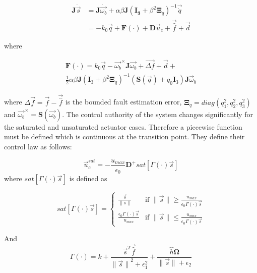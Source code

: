 \begin{equation}
    \begin{split}
        \mathbf{J}\dot{\vec{s}}&=
        \mathbf{J}\dot{\vec{\omega_b}} + \alpha\beta\mathbf{J}(\mathbf{I_3}+\beta^2\mathbf{\Xi}_q)^{-1}\vec{\dot{q}}\\
        &=-k_0\vec{q}+\mathbf{F}(\cdot)+\mathbf{D}\vec{u}_{c}+\vec{\hat{f}}+\vec{d}
    \end{split}
\end{equation}

where

\begin{multline}
    \mathbf{F}(\cdot)=k_0\vec{q}-\vec{\omega_b}^{\times}\mathbf{J}\vec{\omega_b}+\vec{\Delta f} + \vec{d} + \\
    \frac{1}{2}\alpha\beta\mathbf{J}(\mathbf{I}_3+\beta^2\mathbf{\Xi}_q)^{-1}(\mathbf{S}(\vec{q})+q_0\mathbf{I}_3)\mathbf{J}\vec{\omega}_{b}
\end{multline}

where $\Delta \vec{f}=\vec{f}-\vec{\hat{f}}$ is the bounded fault estimation error,
$\mathbf{\Xi}_q=diag(q_1^2,q_2^2,q_3^2)$ and
$\vec{\omega_b}^{\times}=\mathbf{S}(\vec{\omega_b})$. 
The control authority of the system changes significantly for the saturated and unsaturated actuator cases. Therefore a piecewise function must be defined which is continuous at the transition point. They define their control law as follows:

\begin{equation}
\vec{u}^{sat}_{c} = -\frac{u_{max}}{\epsilon_{0}}\mathbf{D}^+ sat[\Gamma(\cdot)\vec{s}]
\end{equation}
where $sat[\Gamma(\cdot)\vec{s}]$ is defined as

\begin{equation}
    sat[\Gamma(\cdot)\vec{s}]=\begin{cases}
        \frac{\vec{s}}{\lVert s \rVert} & \text{if } \lVert \vec{s} \rVert \geq \frac{u_{max}}{\epsilon_0\Gamma(\cdot)\vec{s}}\\
        \frac{\epsilon_0\Gamma(\cdot)\vec{s}}{u_{max}} & \text{if } \lVert \vec{s} \rVert \leq \frac{u_{max}}{\epsilon_0\Gamma(\cdot)\vec{s}}
    \end{cases}
\end{equation}

And 
\begin{equation}
\Gamma(\cdot)=k+\frac{\vec{s}^T\vec{\hat{f}}}{{\lVert \vec{s} \rVert}^2+\epsilon_{1}^2}+ 
\frac{\hat{h}\mathbf{\Omega}}{\lVert \vec{s} \rVert + \epsilon_{2}}
\end{equation}

